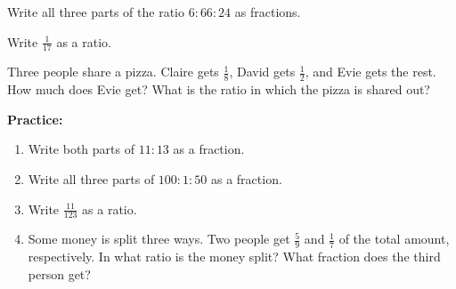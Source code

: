 \documentclass{article}
\begin{document}
\vfill

Write all three parts of the ratio $6:66:24$ as fractions.

\vfill

Write $\frac{1}{17}$ as a ratio.

\vfill

Three people share a pizza. Claire gets $\frac{1}{8}$, David gets $\frac{1}{2}$, and Evie gets the rest. How much does Evie get? What is the ratio in which the pizza is shared out?
\clearpage



{\bf Practice:}

\vspace{5mm}

\begin{enumerate}
\item Write both parts of $11:13$ as a fraction.
\item Write all three parts of $100:1:50$ as a fraction.
\item Write $\frac{11}{123}$ as a ratio.
\item Some money is split three ways. Two people get $\frac{5}{9}$ and $\frac{1}{7}$ of the total amount, respectively. In what ratio is the money split? What fraction does the third person get?
\end{enumerate}
\end{document}
